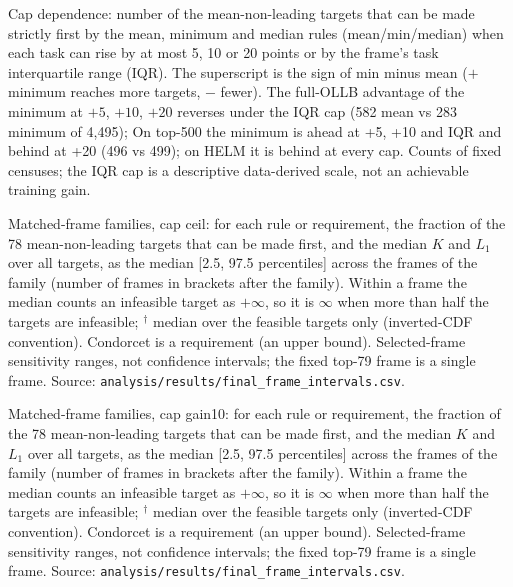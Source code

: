 \begin{table}[tbp]
\caption{Cap dependence: number of the mean-non-leading targets that can be made strictly first by the mean, minimum and median rules (mean/min/median) when each task can rise by at most 5, 10 or 20 points or by the frame's task interquartile range (IQR). The superscript is the sign of min minus mean ($+$ minimum reaches more targets, $-$ fewer). The full-OLLB advantage of the minimum at $+5$, $+10$, $+20$ reverses under the IQR cap (582 mean vs 283 minimum of 4,495); On top-500 the minimum is ahead at +5, +10 and IQR and behind at +20 (496 vs 499); on HELM it is behind at every cap. Counts of fixed censuses; the IQR cap is a descriptive data-derived scale, not an achievable training gain.}
\label{tab:capsmain}
\centering\scriptsize\setlength{\tabcolsep}{4pt}

\end{table}
\begin{table}[tbp]
\caption{Matched-frame families, cap ceil: for each rule or requirement, the fraction of the 78 mean-non-leading targets that can be made first, and the median $K$ and $L_1$ over all targets, as the median [2.5, 97.5 percentiles] across the frames of the family (number of frames in brackets after the family). Within a frame the median counts an infeasible target as $+\infty$, so it is $\infty$ when more than half the targets are infeasible; $^\dagger$ median over the feasible targets only (inverted-CDF convention). Condorcet is a requirement (an upper bound). Selected-frame sensitivity ranges, not confidence intervals; the fixed top-79 frame is a single frame. Source: \texttt{analysis/results/final\_frame\_intervals.csv}.}
\label{tab:framegroupsceil}
\centering\scriptsize\setlength{\tabcolsep}{3pt}
\resizebox{\linewidth}{!}{}
\end{table}
\begin{table}[tbp]
\caption{Matched-frame families, cap gain10: for each rule or requirement, the fraction of the 78 mean-non-leading targets that can be made first, and the median $K$ and $L_1$ over all targets, as the median [2.5, 97.5 percentiles] across the frames of the family (number of frames in brackets after the family). Within a frame the median counts an infeasible target as $+\infty$, so it is $\infty$ when more than half the targets are infeasible; $^\dagger$ median over the feasible targets only (inverted-CDF convention). Condorcet is a requirement (an upper bound). Selected-frame sensitivity ranges, not confidence intervals; the fixed top-79 frame is a single frame. Source: \texttt{analysis/results/final\_frame\_intervals.csv}.}
\label{tab:framegroupsgain10}
\centering\scriptsize\setlength{\tabcolsep}{3pt}
\resizebox{\linewidth}{!}{}
\end{table}
